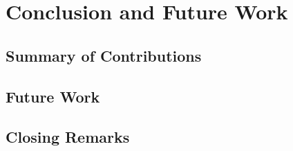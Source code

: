 \chapter{Conclusion and Future Work}\label{ch:conclusion}

\section{Summary of Contributions}\label{sec:summary}

\section{Future Work}\label{sec:future}

\section{Closing Remarks}\label{sec:closing}

